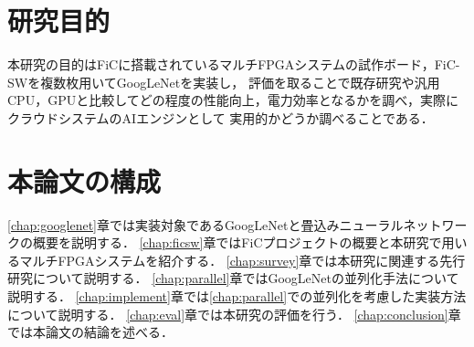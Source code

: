 {  \section{研究目的}
  \label{sec:purpose}
  本研究の目的はFiCに搭載されているマルチFPGAシステムの試作ボード，FiC-SWを複数枚用いてGoogLeNetを実装し，
  評価を取ることで既存研究や汎用CPU，GPUと比較してどの程度の性能向上，電力効率となるかを調べ，実際にクラウドシステムのAIエンジンとして
  実用的かどうか調べることである．

  \section{本論文の構成}
  \label{sec:composition}
  \ref{chap:googlenet}章では実装対象であるGoogLeNetと畳込みニューラルネットワークの概要を説明する．
  \ref{chap:ficsw}章ではFiCプロジェクトの概要と本研究で用いるマルチFPGAシステムを紹介する．
  \ref{chap:survey}章では本研究に関連する先行研究について説明する．
  \ref{chap:parallel}章ではGoogLeNetの並列化手法について説明する．
  \ref{chap:implement}章では\ref{chap:parallel}での並列化を考慮した実装方法について説明する． 
  \ref{chap:eval}章では本研究の評価を行う． 
  \ref{chap:conclusion}章では本論文の結論を述べる．
}
